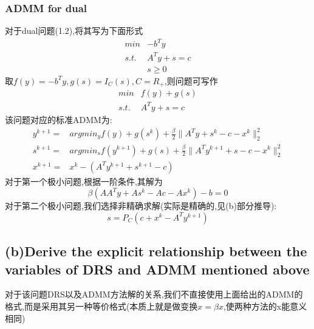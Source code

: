 \documentclass[UTF8]{ctexart}
\begin{document}
\subsubsection{ADMM for dual}
对于dual问题(1.2),将其写为下面形式
\begin{equation}
  \begin{split}
     min & -b^Ty \\
      s.t. & A^Ty+s=c \\
       & s\geq 0
  \end{split}
\end{equation}
取$f(y)=-b^Ty,g(s)=I_C(s),C=R_+$,则问题可写作
\begin{equation}
  \begin{split}
     min & f(y)+g(s) \\
      s.t. & A^Ty+s=c
  \end{split}
\end{equation}
该问题对应的标准ADMM为:
\begin{equation}
  \begin{split}
     y^{k+1} =& argmin_y f(y)+g(s^k)+\frac{\beta}{2}\|A^Ty+s^k-c-x^k \|_2^2 \\
      s^{k+1}= & argmin_s f(y^{k+1})+ g(s)+\frac{\beta}{2}\|A^Ty^{k+1}+s-c-x^k \|_2^2 \\
       x^{k+1}=& x^k-(A ^Ty^{k+1}+s^{k+1}-c)
  \end{split}
\end{equation}
对于第一个极小问题,根据一阶条件,其解为
$$
\beta(AA^Ty+As^k-Ac-Ax^k)-b=0
$$
对于第二个极小问题,我们选择非精确求解(实际是精确的,见(b)部分推导):
$$
s = P_C(c+x^k-A^Ty^{k+1})
$$
\subsection{(b)Derive the explicit relationship between the variables of DRS and ADMM mentioned above}
对于该问题DRS以及ADMM方法解的关系,我们不直接使用上面给出的ADMM的格式,而是采用其另一种等价格式(本质上就是做变换$x=\beta x$,使两种方法的x能意义相同)
\end{document}
